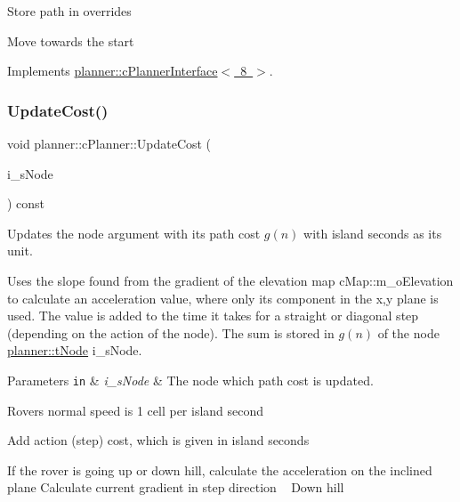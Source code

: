 Store path in overrides

Move towards the start 

Implements \mbox{\hyperlink{classplanner_1_1c_planner_interface_a5c30b547b681b04434102fbcc7c72ea3}{planner\+::c\+Planner\+Interface$<$ 8 $>$}}.

\mbox{\label{classplanner_1_1c_planner_a82e45fc2701e90d3fa9df72f475e455e}} 
\subsubsection{\texorpdfstring{Update\+Cost()}{UpdateCost()}}
{\footnotesize\ttfamily void planner\+::c\+Planner\+::\+Update\+Cost (\begin{DoxyParamCaption}\item[{\mbox{\hyperlink{structplanner_1_1t_node}{t\+Node}} $\ast$}]{i\+\_\+s\+Node }\end{DoxyParamCaption}) const}



Updates the node argument with its path cost $g(n)$ with island seconds as its unit. 

Uses the slope found from the gradient of the elevation map c\+Map\+::m\+\_\+o\+Elevation to calculate an acceleration value, where only its component in the x,y plane is used. The value is added to the time it takes for a straight or diagonal step (depending on the action of the node). The sum is stored in $g(n)$ of the node \mbox{\hyperlink{structplanner_1_1t_node}{planner\+::t\+Node}} i\+\_\+s\+Node. 
\begin{DoxyParams}[1]{Parameters}
\mbox{\tt in}  & {\em i\+\_\+s\+Node} & The node which path cost is updated. \\
\hline
\end{DoxyParams}
Rover\textquotesingle{}s normal speed is 1 cell per island second

Add action (step) cost, which is given in island seconds

If the rover is going up or down hill, calculate the acceleration on the inclined plane Calculate current gradient in step direction ~\newline
 Down hill \mbox{\label{classplanner_1_1c_planner_ad32a7c58b885456ced172b66fed854f0}} 
